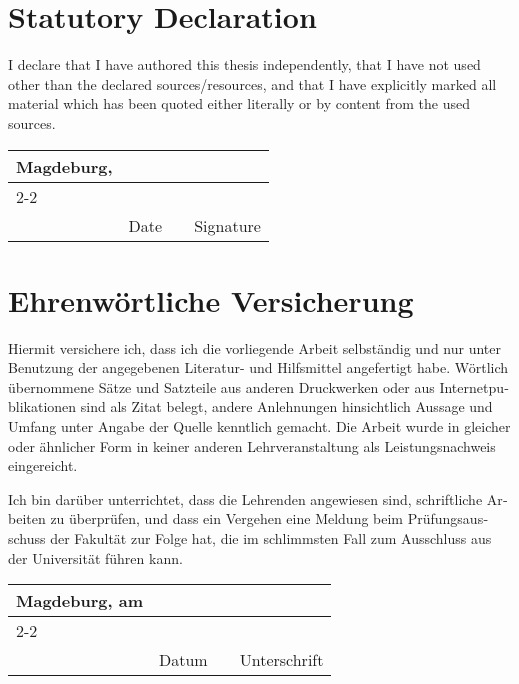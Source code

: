 
\section*{Statutory Declaration}

I declare that I have authored this thesis independently, that I have
not used other than the declared sources/resources, and that I have
explicitly marked all material which has been quoted either literally
or by content from the used sources.

\vfill

\newcommand{\mysignatureblock}[3]{%
  \begin{tabular}{llp{2em}l} 
  #1 & \hspace{3cm}        & & \hspace{56mm} \\\cline{2-2}\cline{4-4}
     &                     & & \\[-3mm]
     & {\footnotesize #2}  & & {\footnotesize #3}
  \end{tabular}
}

\mysignatureblock{Magdeburg,}{Date}{Signature}

\vfill
\vfill
\vfill
\vfill

\section*{Ehrenwörtliche Versicherung}

\foreignlanguage{ngerman}{%
Hiermit versichere ich, dass ich die vorliegende Arbeit selbständig und nur unter Benutzung der
angegebenen Literatur- und Hilfsmittel angefertigt habe. Wörtlich übernommene Sätze und
Satzteile aus anderen Druckwerken oder aus Internetpublikationen sind als Zitat belegt, andere
Anlehnungen hinsichtlich Aussage und Umfang unter Angabe der Quelle kenntlich gemacht. Die
Arbeit wurde in gleicher oder ähnlicher Form in keiner anderen Lehrveranstaltung als
Leistungsnachweis eingereicht.}

\foreignlanguage{ngerman}{%
Ich bin darüber unterrichtet, dass die Lehrenden angewiesen sind, schriftliche Arbeiten zu
überprüfen, und dass ein Vergehen eine Meldung beim Prüfungsausschuss der Fakultät zur Folge
hat, die im schlimmsten Fall zum Ausschluss aus der Universität führen kann.
}

\vfill

\mysignatureblock{Magdeburg, am}{Datum}{Unterschrift}


\newpage
\newpage

